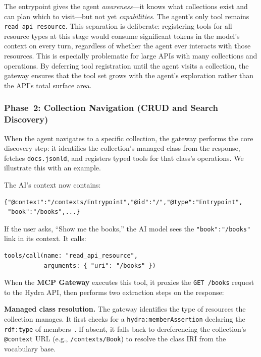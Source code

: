 \documentclass[11pt,a4paper]{article}
\begin{document}
The entrypoint gives the agent \emph{awareness}---it knows what collections exist and can plan which to visit---but not yet \emph{capabilities}. The agent's only tool remains \texttt{read\_api\_resource}. This separation is deliberate: registering tools for all resource types at this stage would consume significant tokens in the model's context on every turn, regardless of whether the agent ever interacts with those resources. This is especially problematic for large APIs with many collections and operations. By deferring tool registration until the agent visits a collection, the gateway ensures that the tool set grows with the agent's exploration rather than the API's total surface area.

\subsubsection{Phase~2: Collection Navigation (CRUD and Search Discovery)}

When the agent navigates to a specific collection, the gateway performs the core discovery step: it identifies the collection's managed class from the response, fetches \texttt{docs.jsonld}, and registers typed tools for that class's operations. We illustrate this with an example.

The AI's context now contains:

\begin{small}
\begin{verbatim}
{"@context":"/contexts/Entrypoint","@id":"/","@type":"Entrypoint",
 "book":"/books",...}
\end{verbatim}
\end{small}

If the user asks, ``Show me the books,'' the AI model sees the \texttt{"book":"/books"} link in its context. It calls:

\begin{small}
\begin{verbatim}
tools/call(name: "read_api_resource",
           arguments: { "uri": "/books" })
\end{verbatim}
\end{small}

When the \textbf{MCP Gateway} executes this tool, it proxies the \texttt{GET /books} request to the Hydra API, then performs two extraction steps on the response:

\textbf{Managed class resolution.} The gateway identifies the type of resources the collection manages. It first checks for a \texttt{hydra:memberAssertion} declaring the \texttt{rdf:type} of members~\cite[§6]{hydra}. If absent, it falls back to dereferencing the collection's \texttt{@context} URL (e.g., \texttt{/contexts/Book}) to resolve the class IRI from the vocabulary base.
\end{document}
